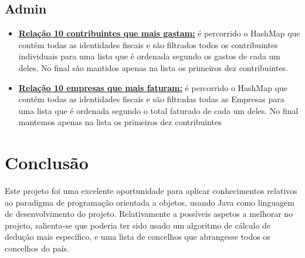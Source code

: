 \subsection{Admin}
\begin{itemize}
\item \textbf{\underline{Relação 10 contribuintes que mais gastam:}} é percorrido o HashMap que contém todas as identidades fiscais e são filtrados todos os contribuintes individuais para uma lista que é ordenada segundo os gastos de cada um deles. No final são mantidos apenas na lista os primeiros dez contribuintes.

\item \textbf{\underline{Relação 10 empresas que mais faturam:}} é percorrido o HashMap que contém todas as identidades fiscais e são filtradas todas as Empresas para uma lista que é ordenada segundo o total faturado de cada um deles. No final mantemos apenas na lista os primeiros dez contribuintes
\end{itemize}



\section{Conclusão}
Este projeto foi uma excelente oportunidade para aplicar conhecimentos relativos ao paradigma de programação orientada a objetos, usando Java como linguagem de desenvolvimento do projeto. Relativamente a possíveis aspetos a melhorar no projeto, salienta-se que poderia ter sido usado um algoritmo de cálculo de dedução mais específico, e uma lista de concelhos que abrangesse todos os concelhos do país.

